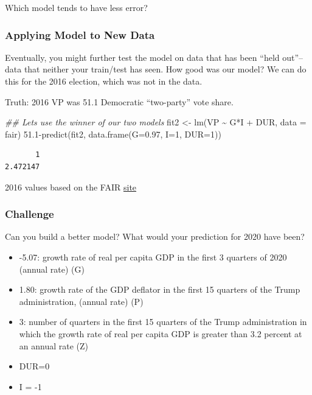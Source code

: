 \documentclass[
  letterpaper,
  DIV=11,
  numbers=noendperiod]{scrreprt}
\newenvironment{Shaded}{\begin{snugshade}}{\end{snugshade}}
\newcommand{\AttributeTok}[1]{\textcolor[rgb]{0.40,0.45,0.13}{#1}}
\newcommand{\DecValTok}[1]{\textcolor[rgb]{0.68,0.00,0.00}{#1}}
\newcommand{\DocumentationTok}[1]{\textcolor[rgb]{0.37,0.37,0.37}{\textit{#1}}}
\newcommand{\FloatTok}[1]{\textcolor[rgb]{0.68,0.00,0.00}{#1}}
\newcommand{\FunctionTok}[1]{\textcolor[rgb]{0.28,0.35,0.67}{#1}}
\newcommand{\NormalTok}[1]{\textcolor[rgb]{0.00,0.23,0.31}{#1}}
\newcommand{\OtherTok}[1]{\textcolor[rgb]{0.00,0.23,0.31}{#1}}
\newcommand{\SpecialCharTok}[1]{\textcolor[rgb]{0.37,0.37,0.37}{#1}}
\providecommand{\tightlist}{%
  \setlength{\itemsep}{0pt}\setlength{\parskip}{0pt}}\usepackage{longtable,booktabs,array}
\begin{document}
Which model tends to have less error?

\hypertarget{applying-model-to-new-data}{%
\subsubsection{Applying Model to New
Data}\label{applying-model-to-new-data}}

Eventually, you might further test the model on data that has been
``held out''-- data that neither your train/test has seen. How good was
our model? We can do this for the 2016 election, which was not in the
data.

Truth: 2016 VP was 51.1 Democratic ``two-party'' vote share.

\begin{Shaded}
\begin{Highlighting}[]
\DocumentationTok{\#\# Let\textquotesingle{}s use the winner of our two models}
\NormalTok{fit2 }\OtherTok{\textless{}{-}} \FunctionTok{lm}\NormalTok{(VP }\SpecialCharTok{\textasciitilde{}}\NormalTok{ G}\SpecialCharTok{*}\NormalTok{I }\SpecialCharTok{+}\NormalTok{  DUR, }\AttributeTok{data =}\NormalTok{ fair)}
\FloatTok{51.1}\SpecialCharTok{{-}}\FunctionTok{predict}\NormalTok{(fit2, }\FunctionTok{data.frame}\NormalTok{(}\AttributeTok{G=}\FloatTok{0.97}\NormalTok{, }\AttributeTok{I=}\DecValTok{1}\NormalTok{, }\AttributeTok{DUR=}\DecValTok{1}\NormalTok{))}
\end{Highlighting}
\end{Shaded}

\begin{verbatim}
       1 
2.472147 
\end{verbatim}

2016 values based on the FAIR
\href{https://fairmodel.econ.yale.edu/vote2016/index2.htm}{site}

\hypertarget{challenge}{%
\subsubsection{Challenge}\label{challenge}}

Can you build a better model? What would your prediction for 2020 have
been?

\begin{itemize}
\tightlist
\item
  -5.07: growth rate of real per capita GDP in the first 3 quarters of
  2020 (annual rate) (G)
\item
  1.80: growth rate of the GDP deflator in the first 15 quarters of the
  Trump administration, (annual rate) (P)
\item
  3: number of quarters in the first 15 quarters of the Trump
  administration in which the growth rate of real per capita GDP is
  greater than 3.2 percent at an annual rate (Z)
\item
  DUR=0
\item
  I = -1
\end{itemize}
\end{document}
